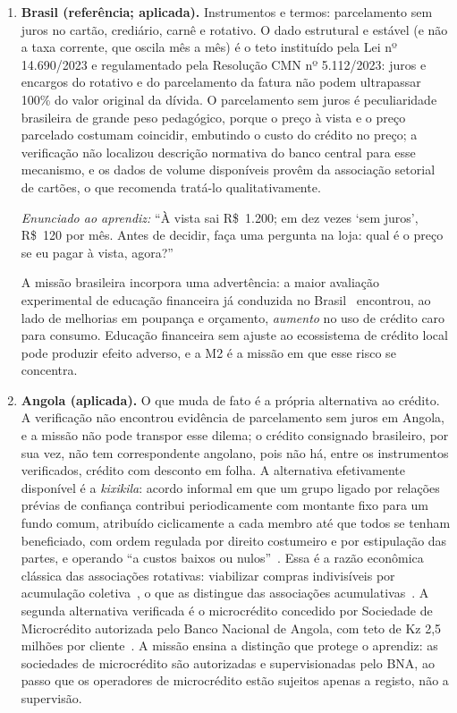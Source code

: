 \begin{enumerate}
\item[(a)] \textbf{Brasil (referência; aplicada).} Instrumentos e termos: parcelamento sem juros no cartão, crediário, carnê e rotativo. O dado estrutural e estável (e não a taxa corrente, que oscila mês a mês) é o teto instituído pela Lei nº 14.690/2023 e regulamentado pela Resolução CMN nº 5.112/2023: juros e encargos do rotativo e do parcelamento da fatura não podem ultrapassar 100\% do valor original da dívida. O parcelamento sem juros é peculiaridade brasileira de grande peso pedagógico, porque o preço à vista e o preço parcelado costumam coincidir, embutindo o custo do crédito no preço; a verificação não localizou descrição normativa do banco central para esse mecanismo, e os dados de volume disponíveis provêm da associação setorial de cartões, o que recomenda tratá-lo qualitativamente.

\noindent\textit{Enunciado ao aprendiz:} ``À vista sai R\$~1.200; em dez vezes `sem juros', R\$~120 por mês. Antes de decidir, faça uma pergunta na loja: qual é o preço se eu pagar à vista, agora?''

A missão brasileira incorpora uma advertência: a maior avaliação experimental de educação financeira já conduzida no Brasil~\cite{bruhn2016} encontrou, ao lado de melhorias em poupança e orçamento, \emph{aumento} no uso de crédito caro para consumo. Educação financeira sem ajuste ao ecossistema de crédito local pode produzir efeito adverso, e a M2 é a missão em que esse risco se concentra.

\item[(b)] \textbf{Angola (aplicada).} O que muda de fato é a própria alternativa ao crédito. A verificação não encontrou evidência de parcelamento sem juros em Angola, e a missão não pode transpor esse dilema; o crédito consignado brasileiro, por sua vez, não tem correspondente angolano, pois não há, entre os instrumentos verificados, crédito com desconto em folha. A alternativa efetivamente disponível é a \textit{kixikila}: acordo informal em que um grupo ligado por relações prévias de confiança contribui periodicamente com montante fixo para um fundo comum, atribuído ciclicamente a cada membro até que todos se tenham beneficiado, com ordem regulada por direito costumeiro e por estipulação das partes, e operando ``a custos baixos ou nulos''~\cite{carlos2014kixikila}. Essa é a razão econômica clássica das associações rotativas: viabilizar compras indivisíveis por acumulação coletiva~\cite{besley1994}, o que as distingue das associações acumulativas~\cite{bouman1995}. A segunda alternativa verificada é o microcrédito concedido por Sociedade de Microcrédito autorizada pelo Banco Nacional de Angola, com teto de Kz 2,5 milhões por cliente~\cite{bna_microcredito}. A missão ensina a distinção que protege o aprendiz: as sociedades de microcrédito são autorizadas e supervisionadas pelo BNA, ao passo que os operadores de microcrédito estão sujeitos apenas a registo, não a supervisão.


\end{enumerate}
